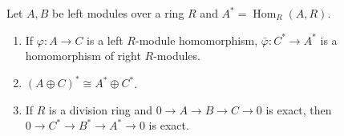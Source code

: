 Let $A, B$ be left modules over a ring $R$ and $A^* = \operatorname{Hom}_R(A,R)$.
\begin{enumerate}
\item[(i)] If $\varphi : A \to C$ is a left $R$-module homomorphism, $\bar{\varphi} : C^* \to A^*$ is a homomorphism of right $R$-modules.
\item[(ii)] $(A \oplus C)^* \cong A^* \oplus C^*$.
\item[(iii)] If $R$ is a division ring and $0 \to A \to B \to C \to 0$ is exact, then $0 \to C^* \to B^* \to A^* \to 0$ is exact.
\end{enumerate}
